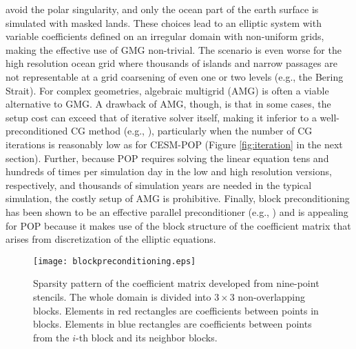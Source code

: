 avoid the polar singularity, and only the ocean part of the earth
surface is simulated with masked lands. These choices lead to an
elliptic system with variable coefficients defined on an irregular
domain with non-uniform grids, making the effective use of GMG
non-trivial.  The scenario is even worse for the high resolution ocean
grid where thousands of islands and narrow passages 
are not representable at a grid coarsening of even one or two levels
(e.g., the Bering Strait). For complex geometries, algebraic multigrid (AMG) is often a viable
alternative to GMG.  A drawback of AMG, though, is that in some cases,
the setup cost can exceed that of iterative solver itself, making it
inferior to a well-preconditioned CG method (e.g.,
\cite{muller2014massively}), particularly when the number of CG
iterations is reasonably low as for CESM-POP (Figure
\ref{fig:iteration} in the next section). 
Further, because POP requires solving the linear
equation tens and hundreds of times per simulation day in the low and
high resolution versions, respectively, and thousands of
simulation years are needed in the typical simulation, the
costly setup of AMG is prohibitive.
Finally, block preconditioning has been shown to be an effective
parallel preconditioner (e.g., \cite{concus1985block, white2011block})
and is appealing for POP because it makes use of the block structure of the
coefficient matrix that arises from discretization of the
elliptic equations.

\begin {figure}
\centering
\texttt{[image: blockpreconditioning.eps]}
\caption[] {Sparsity pattern of the coefficient matrix developed from nine-point stencils.
The whole domain is divided into $3\times3$ non-overlapping blocks.
Elements in red rectangles are coefficients between points in blocks.
Elements in blue rectangles are coefficients between points from the $i$-th block and its neighbor blocks. \label{fig:blockprecond}}
\vspace{-.2in}
\end{figure}

